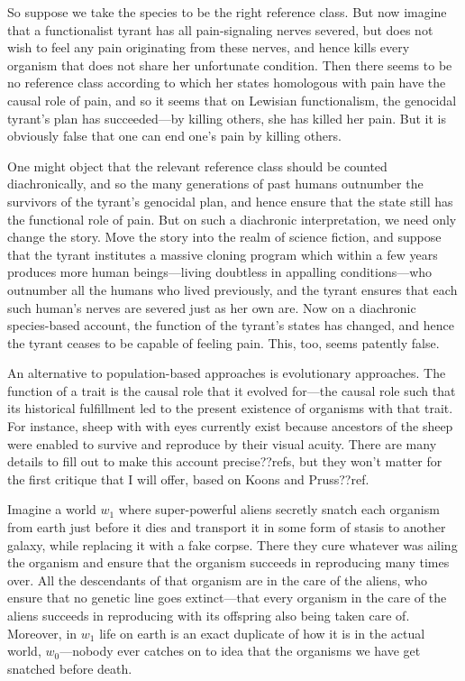 So suppose we take the species to be the right reference class. But now imagine that a functionalist tyrant has 
all pain-signaling nerves severed, but does not wish to feel any pain originating from these nerves, and hence 
kills every organism that does not share  her unfortunate condition. Then there seems to be no reference 
class according to which her states homologous with pain have the causal role of pain, and so it seems that on 
Lewisian functionalism, the genocidal tyrant's plan has succeeded---by killing others, she has killed her pain.
But it is obviously false that one can end one's pain by killing others.

One might object that the relevant reference class should be counted diachronically, and so the many generations of 
past humans outnumber the survivors of the tyrant's genocidal plan, and hence ensure that the state still has the 
functional role of pain. But on such a diachronic interpretation, we need only change the story. Move the story into
the realm of science fiction, and suppose that the tyrant institutes a massive cloning program which within a few 
years produces more human beings---living doubtless in appalling conditions---who outnumber all the humans who lived
previously, and the tyrant ensures that each such human's nerves are severed just as her own are. Now on a diachronic
species-based account, the function of the tyrant's states has changed, and hence the tyrant ceases to be capable of 
feeling pain. This, too, seems patently false.

An alternative to population-based approaches is evolutionary approaches. The function of a trait is the
causal role that it evolved for---the causal role such that its historical fulfillment led to the present 
existence of organisms with that trait. For instance, sheep with with eyes currently exist because ancestors 
of the sheep were enabled to survive and reproduce by their visual acuity. There are many details to fill out 
to make this account precise??refs, but they won't matter for the first critique that I will offer, based on Koons and Pruss??ref.  

Imagine a world $w_1$ where super-powerful aliens secretly snatch each organism from earth just before it dies and transport it in
some form of stasis to another galaxy, while replacing it with a fake corpse. There they cure whatever 
was ailing the organism and ensure that the organism succeeds in reproducing many times over. All the descendants of that 
organism are in the care of the aliens, who ensure that no genetic line goes extinct---that every organism in 
the care of the aliens succeeds in reproducing with its offspring also being taken care of. Moreover, in $w_1$
life on earth is an exact duplicate of how it is in the actual world, $w_0$---nobody ever catches on to idea that the organisms we 
have get snatched before death.

